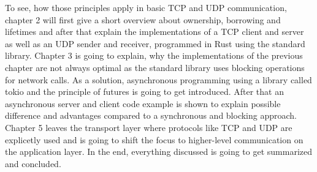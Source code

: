 To see, how those principles apply in basic TCP and UDP communication, chapter 2 will first give a short overview about
ownership, borrowing and lifetimes and after that explain the implementations of a TCP client and server as well as an
UDP sender and receiver, programmed in Rust using the standard library. Chapter 3 is going to explain, why the
implementations of the previous chapter are not always optimal as the standard library uses blocking operations for
network calls. As a solution, asynchronous programming using a library called tokio and the principle of futures is
going to get introduced. After that an asynchronous server and client code example is shown to explain possible
difference and advantages compared to a synchronous and blocking approach. Chapter 5 leaves the transport layer where
protocols like TCP and UDP are explicetly used and is going to shift the focus to higher-level communication on the
application layer. In the end, everything discussed is going to get summarized and concluded.
